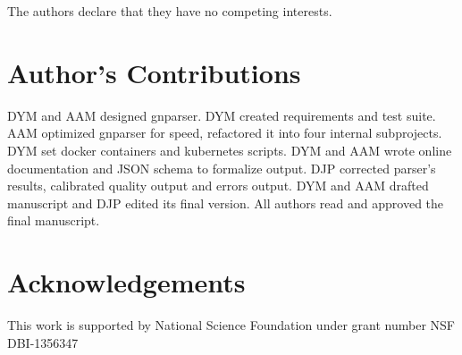 \documentclass{bmcart}
\begin{document}
The authors declare that they have no competing interests.

\section*{Author's Contributions}

DYM and AAM designed gnparser. DYM created requirements and test suite. AAM
optimized gnparser for speed, refactored it into four internal subprojects.
DYM set docker containers and kubernetes scripts. DYM and AAM wrote online
documentation and JSON schema to formalize output. DJP corrected parser's
results, calibrated quality output and errors output. DYM and AAM drafted
manuscript and DJP edited its final version. All authors read and approved the
final manuscript.

\section*{Acknowledgements}

This work is supported by National Science Foundation under grant number NSF
DBI-1356347



\end{document}
